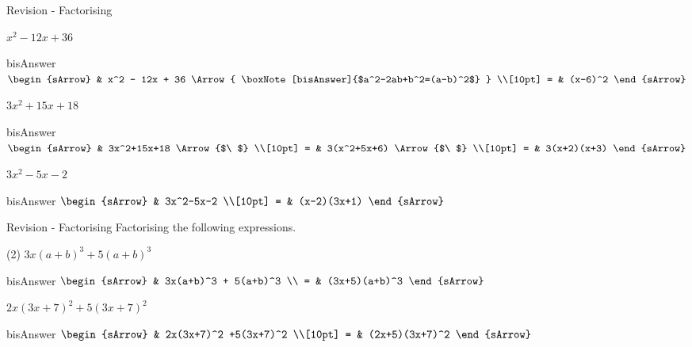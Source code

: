 \begin{bxTip}{\hypertarget{url09A}{Revision - Factorising}}
\begin{tasksample}
    \task[] $x^2 - 12x + 36 $
              \begin{envOut}[equal height group=hRevF1]{bisAnswer}
			       $\begin{sArrow}
			             & x^2 - 12x + 36     \Arrow{ \boxNote[bisAnswer]{$a^2-2ab+b^2=(a-b)^2$} } \\[10pt]
                       = & (x-6)^2              
	                \end{sArrow}$
              \end{envOut}



	\task[] $3x^2+15x+18$
              \begin{envOut}[equal height group=hRevF1]{bisAnswer}
			       $\begin{sArrow}
			              & 3x^2+15x+18      \Arrow{$\ $} \\[10pt]
                       =  & 3(x^2+5x+6)      \Arrow{$\ $} \\[10pt]
					   =  & 3(x+2)(x+3)
	                \end{sArrow}$
              \end{envOut}%
			  
    \task[] $3x^2-5x-2$
              \begin{envOut}[equal height group=hRevF1]{bisAnswer}
                 $\begin{sArrow}
  				       & 3x^2-5x-2          \\[10pt]
				     = & (x-2)(3x+1)   
                  \end{sArrow}$					 
              \end{envOut}
\end{tasksample}
\end{bxTip}


\clearpage\noindent%
\begin{bxTip}{\hypertarget{url09A}{Revision - Factorising}}    
    Factorising the following expressions.
\begin{tasksample}(2)
    \task[] $3x(a+b)^3 + 5(a+b)^3$
              \begin{envOut}[equal height group=hRevF1]{bisAnswer}
			       $\begin{sArrow}
			             & 3x(a+b)^3 + 5(a+b)^3  \\   
                       = & (3x+5)(a+b)^3   
	                \end{sArrow}$
              \end{envOut}
 
	\task[] $2x(3x+7)^2 +5(3x+7)^2$
              \begin{envOut}[equal height group=hRevF1]{bisAnswer}
			     $\begin{sArrow}
  				        & 2x(3x+7)^2 +5(3x+7)^2         \\[10pt] 
                      = & (2x+5)(3x+7)^2 
                  \end{sArrow}$					  
              \end{envOut}%
\end{tasksample}
\end{bxTip}


